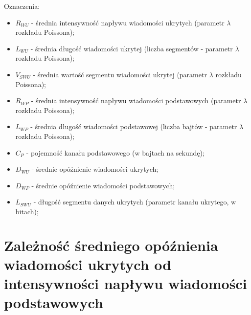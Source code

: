 \documentclass[a4paper, twoside, openright, 12pt]{report}
\begin{document}
    Oznaczenia:
    \begin{itemize} \itemsep1pt \parskip0pt 
        \item \( R_{WU} \) - średnia intensywność napływu wiadomości ukrytych (parametr \(\lambda\) rozkładu Poissona);
        \item \( L_{WU} \) - średnia długość wiadomości ukrytej (liczba segmentów - parametr \(\lambda\) rozkładu Poissona);
        \item \( V_{SWU} \) - średnia wartość segmentu wiadomości ukrytej (parametr \(\lambda\) rozkładu Poissona);
        \item \( R_{WP} \) - średnia intensywność napływu wiadomości podstawowych (parametr \(\lambda\) rozkładu Poissona);
        \item \( L_{WP} \) - średnia długość wiadomości podstawowej (liczba bajtów - parametr \(\lambda\) rozkładu Poissona);
        \item \( C_P \) - pojemność kanału podstawowego (w bajtach na sekundę);
        \item \( D_{WU} \) - średnie opóźnienie wiadomości ukrytych;
        \item \( D_{WP} \) - średnie opóźnienie wiadomości podstawowych;
        \item \( L_{SWU} \) - długość segmentu danych ukrytych (parametr kanału ukrytego, w bitach);
    \end{itemize}



    \section{Zależność średniego opóźnienia wiadomości ukrytych od intensywności napływu wiadomości podstawowych}
\end{document}

